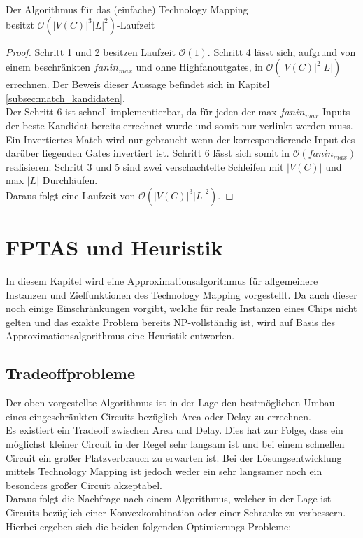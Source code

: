 \documentclass[11pt, a4paper, german]{article}
\newcommand{\TM}{Technology  Mapping }
\begin{document}
\begin{cor}{Der Algorithmus für das (einfache) \TM  \\ besitzt $\mathcal{O}(  |V(C)|^3|L|^2)$-Laufzeit}
\end{cor}
\begin{proof}
Schritt 1 und 2 besitzen Laufzeit $\mathcal{O}(1)$. Schritt 4 lässt sich, aufgrund von einem beschränkten $fanin_{max}$ und ohne Highfanoutgates, in $\mathcal{O}(|V(C)|^2|L|)$ errechnen. Der Beweis dieser Aussage befindet sich in Kapitel \ref{subsec:match_kandidaten}.\\
Der Schritt 6 ist schnell implementierbar, da für jeden der max $fanin_{max}$ Inputs der beste Kandidat bereits errechnet wurde und somit nur verlinkt werden muss. Ein Invertiertes Match wird nur gebraucht wenn der korrespondierende Input des darüber liegenden Gates invertiert ist. Schritt 6 lässt sich somit in  $\mathcal{O}(fanin_{max})$ realisieren. Schritt 3 und 5 sind zwei verschachtelte Schleifen mit  $|V(C)|$ und max $|L|$ Durchläufen. \\
Daraus folgt eine Laufzeit von $\mathcal{O}(  |V(C)|^3|L|^2)$.
\end{proof}



\newpage
\section{FPTAS und Heuristik}
\label{sec:allg_algorithmus}
In diesem Kapitel wird eine Approximationsalgorithmus für allgemeinere Instanzen und Zielfunktionen des \TM vorgestellt. Da auch dieser noch einige Einschränkungen vorgibt, welche für reale Instanzen eines Chips nicht gelten und   das exakte Problem bereits NP-vollständig ist, wird auf Basis des Approximationsalgorithmus eine Heuristik entworfen.

\subsection{Tradeoffprobleme}
\label{subsec:tradeoffprobleme}
Der oben vorgestellte Algorithmus ist in der Lage den bestmöglichen Umbau eines eingeschränkten Circuits bezüglich Area oder Delay zu errechnen. \\
Es existiert  ein Tradeoff zwischen Area und Delay. Dies hat zur Folge, dass ein möglichst kleiner Circuit in der Regel sehr langsam ist und  bei einem schnellen Circuit ein großer Platzverbrauch zu erwarten ist. 
Bei der Lösungsentwicklung mittels \TM  ist jedoch weder ein sehr langsamer noch ein besonders großer Circuit akzeptabel.\\
Daraus folgt die Nachfrage nach einem Algorithmus, welcher in der Lage ist Circuits  bezüglich einer Konvexkombination oder einer Schranke zu verbessern. Hierbei ergeben sich die beiden folgenden Optimierungs-Probleme: \\
\end{document}
